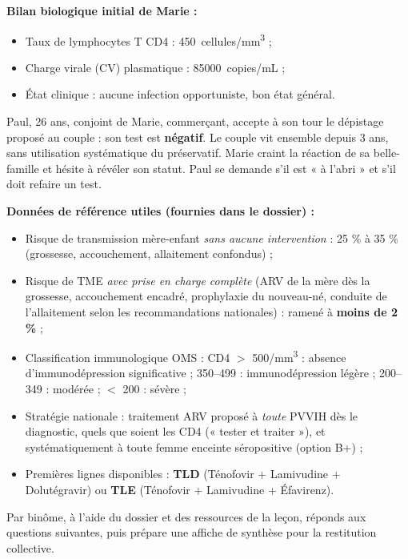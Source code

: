 \documentclass[11pt]{article}
\newcounter{popsec}
\newcounter{popsub}
\newcommand{\courssub}[1]{%
  \stepcounter{popsub}%
  \par\vspace{9pt}\noindent{\popxbold\fontsize{11.5}{13}\selectfont\color{popink}{\color{poporange}\thepopsec.\thepopsub}\hspace{6pt}#1}\par\nopagebreak\vspace{4pt}
}
\begin{document}
\textbf{Bilan biologique initial de Marie :}
\begin{itemize}
\item Taux de lymphocytes T CD4 : \SI{450}{cellules/mm^3} ;
\item Charge virale (CV) plasmatique : \SI{85 000}{copies/mL} ;
\item État clinique : aucune infection opportuniste, bon état général.
\end{itemize}

Paul, 26 ans, conjoint de Marie, commerçant, accepte à son tour le dépistage proposé au couple : son test est \textbf{négatif}. Le couple vit ensemble depuis 3 ans, sans utilisation systématique du préservatif. Marie craint la réaction de sa belle-famille et hésite à révéler son statut. Paul se demande s'il est « à l'abri » et s'il doit refaire un test.

\textbf{Données de référence utiles (fournies dans le dossier) :}
\begin{itemize}
\item Risque de transmission mère-enfant \emph{sans aucune intervention} : 25 \% à 35 \% (grossesse, accouchement, allaitement confondus) ;
\item Risque de TME \emph{avec prise en charge complète} (ARV de la mère dès la grossesse, accouchement encadré, prophylaxie du nouveau-né, conduite de l'allaitement selon les recommandations nationales) : ramené à \textbf{moins de 2 \%} ;
\item Classification immunologique OMS : CD4 $>$ 500/mm\textsuperscript{3} : absence d'immunodépression significative ; 350--499 : immunodépression légère ; 200--349 : modérée ; $<$ 200 : sévère ;
\item Stratégie nationale : traitement ARV proposé à \emph{toute} PVVIH dès le diagnostic, quels que soient les CD4 (« tester et traiter »), et systématiquement à toute femme enceinte séropositive (option B+) ;
\item Premières lignes disponibles : \textbf{TLD} (Ténofovir + Lamivudine + Dolutégravir) ou \textbf{TLE} (Ténofovir + Lamivudine + Éfavirenz).
\end{itemize}

\courssub{Consignes}

Par binôme, à l'aide du dossier et des ressources de la leçon, réponds aux questions suivantes, puis prépare une affiche de synthèse pour la restitution collective.
\end{document}
